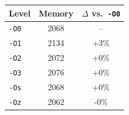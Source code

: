 \begin{tabular*}{\columnwidth}{@{\extracolsep\fill}lcc@{\extracolsep\fill}}
\toprule
\textbf{Level} & \textbf{Memory} & \textbf{$\Delta$ vs.\ \texttt{-O0}} \\
\midrule
\texttt{-O0} & 2068 & -- \\
\texttt{-O1} & 2134 & +3\% \\
\texttt{-O2} & 2072 & +0\% \\
\texttt{-O3} & 2076 & +0\% \\
\texttt{-Os} & 2068 & +0\% \\
\texttt{-Oz} & 2062 & -0\% \\
\bottomrule
\end{tabular*}

